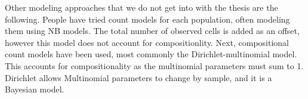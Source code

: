 Other modeling approaches that we do not get into with the thesis are the following.
People have tried count models for each population, often modeling them using NB models.
The total number of observed cells is added as an offset, however this model does not account for compositionlity.
Next, compositional count models have been used, most commonly the Dirichlet-multinomial model.
This accounts for compositionality as the multinomial parameters must sum to 1.
Dirichlet allows Multinomial parameters to change by sample, and it is a Bayesian model.